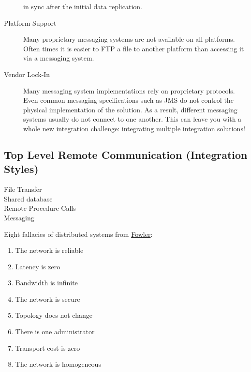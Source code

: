 \documentclass[../Main.tex]{subfiles}
\begin{document}
\begin{description}
    in sync after the initial data replication.
    \item[Platform Support]  Many proprietary messaging systems are not available on all platforms. Often times it is easier to FTP a 
    file to another platform than accessing it via a messaging system.
    \item[Vendor Lock-In] Many messaging system implementations rely on proprietary protocols. Even common messaging 
    specifications such as JMS do not control the physical implementation of the solution. As a result, 
    different messaging systems usually do not connect to one another. This can leave you with a whole 
    new integration challenge: integrating multiple integration solutions!
\end{description}

\subsection{Top Level Remote Communication (Integration Styles)}
\begin{multicols}{2}
    \begin{description}
        \item[File Transfer]
        \item[Shared database]
        \item[Remote Procedure Calls]
        \item[Messaging]
    \end{description}
    \columnbreak

    Eight fallacies of distributed systems from \href{http://www.drdobbs.com/errant-architectures/184414966}{Fowler}:
    \begin{enumerate}
        \item The network is reliable
        \item Latency is zero
        \item Bandwidth is infinite
        \item The network is secure
        \item Topology does not change
        \item There is one administrator
        \item Transport cost is zero
        \item The network is homogeneous
    \end{enumerate}
\end{multicols}
\end{document}

